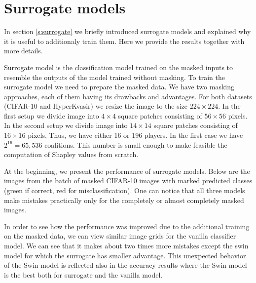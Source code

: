\documentclass[magisterska,en]{pracamgr}
\begin{document}
\section{Surrogate models}
In section \ref{s:surrogate} we briefly introduced surrogate models and explained why it is useful to additionaly train them. Here we provide the results together with more details. 

Surrogate model is the classification model trained on the masked inputs to resemble the outputs of the model trained without masking. To train the surrogate model we need to prepare the masked data.
We have two masking approaches, each of them having its drawbacks and advantages. For both datasets (CIFAR-10 and HyperKvasir) we resize the image to the size $224\times 224$. In the first setup we divide image into $4\times 4$ square patches consisting of $56\times 56$ pixels. In the second setup we divide image into $14\times 14$ square patches consisting of $16\times 16$ pixels. Thus, we have either 16 or 196 players. In the first case we have $2^{16}=65,536$ coalitions. This number is small enough to make feasible the computation of Shapley values from scratch. 

At the beginning, we present the performance of surrogate models. Below are the images from the batch of masked CIFAR-10 images with marked predicted classes (green if correct, red for misclassification). One can notice that all three models make mistakes practically only for the completely or almost completely masked images.




In order to see how the performance was improved due to the additional training on the masked data, we can view similar image grids for the vanilla classifier model. We can see that it makes about two times more mistakes except the swin model for which the surrogate has smaller advantage. This unexpected behavior of the Swin model is reflected also in the accuracy results where the Swin model is the best both for surrogate and the vanilla model.
\end{document}
